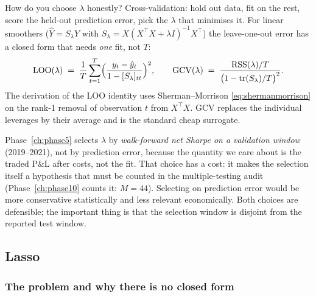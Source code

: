 How do you choose $\lambda$ honestly? Cross-validation: hold out data, fit on the rest,
score the held-out prediction error, pick the $\lambda$ that minimises it. For linear
smoothers ($\hat Y = S_\lambda Y$ with $S_\lambda = X(X^{\top}X+\lambda I)^{-1}X^{\top}$)
the leave-one-out error has a closed form that needs \emph{one} fit, not $T$:
\begin{equation}
  \mathrm{LOO}(\lambda) \;=\; \frac{1}{T}\sum_{t=1}^{T}
  \Bigl(\frac{y_t-\hat y_t}{1-[S_\lambda]_{tt}}\Bigr)^{2},
  \qquad
  \mathrm{GCV}(\lambda) \;=\; \frac{\mathrm{RSS}(\lambda)/T}{\bigl(1-\operatorname{tr}(S_\lambda)/T\bigr)^{2}} .
  \label{eq:gcv}
\end{equation}
The derivation of the LOO identity uses Sherman--Morrison \eqref{eq:shermanmorrison} on
the rank-1 removal of observation $t$ from $X^{\top}X$. GCV replaces the individual
leverages by their average and is the standard cheap surrogate.

\begin{remark}
Phase~\ref{ch:phase5} selects $\lambda$ by \emph{walk-forward net Sharpe on a validation
window} (2019--2021), not by prediction error, because the quantity we care about is the
traded P\&L after costs, not the fit. That choice has a cost: it makes the selection
itself a hypothesis that must be counted in the multiple-testing audit
(Phase~\ref{ch:phase10} counts it: $M=44$). Selecting on prediction error would be more
conservative statistically and less relevant economically. Both choices are defensible;
the important thing is that the selection window is disjoint from the reported test
window.
\end{remark}

\subsection{Lasso}
\label{sec:lasso}

\subsubsection{The problem and why there is no closed form}

